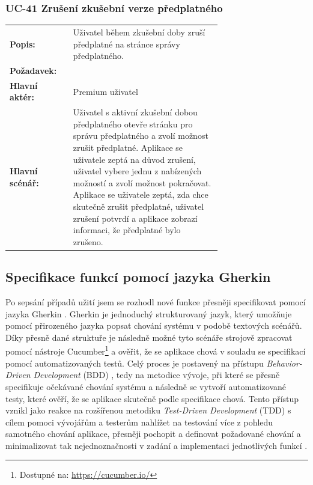 \subsubsection{UC-41 Zrušení zkušební verze předplatného}

\begin{tabular}{lp{0.7\linewidth}}
  \textbf{Popis:} & Uživatel během zkušební doby zruší předplatné na stránce správy předplatného. \\
  \textbf{Požadavek:} & \nameref{sec:fp-free-trial} \\
  \textbf{Hlavní aktér:} & Premium uživatel \\
  \textbf{Hlavní scénář:} & Uživatel s aktivní zkušební dobou předplatného otevře stránku pro správu předplatného a zvolí možnost zrušit předplatné. Aplikace se uživatele zeptá na důvod zrušení, uživatel vybere jednu z nabízených možností a zvolí možnost pokračovat. Aplikace se uživatele zeptá, zda chce skutečně zrušit předplatné, uživatel zrušení potvrdí a aplikace zobrazí informaci, že předplatné bylo zrušeno. \\
\end{tabular}

\subsection{Specifikace funkcí pomocí jazyka Gherkin}

Po sepsání případů užití jsem se rozhodl nové funkce přesněji specifikovat pomocí jazyka Gherkin \cite{CucumberDocs}. Gherkin je jednoduchý strukturovaný jazyk, který umožňuje pomocí přirozeného jazyka popsat chování systému v podobě textových scénářů. Díky přesně dané struktuře je následně možné tyto scénáře strojově zpracovat pomocí nástroje Cucumber\footnote{Dostupné na: \href{https://cucumber.io/}{https://cucumber.io/}} a ověřit, že se aplikace chová v souladu se specifikací pomocí automatizovaných testů. Celý proces je postavený na přístupu \textit{Behavior-Driven Development} (BDD) \cite{BDD}, tedy na metodice vývoje, při které se přesně specifikuje očekávané chování systému a následně se vytvoří automatizované testy, které ověří, že se aplikace skutečně podle specifikace chová. Tento přístup vznikl jako reakce na rozšířenou metodiku \textit{Test-Driven Development} (TDD) s cílem pomoci vývojářům a testerům nahlížet na testování více z pohledu samotného chování aplikace, přesněji pochopit a definovat požadované chování a minimalizovat tak nejednoznačnosti v zadání a implementaci jednotlivých funkcí \cite{BDDHistory}.

